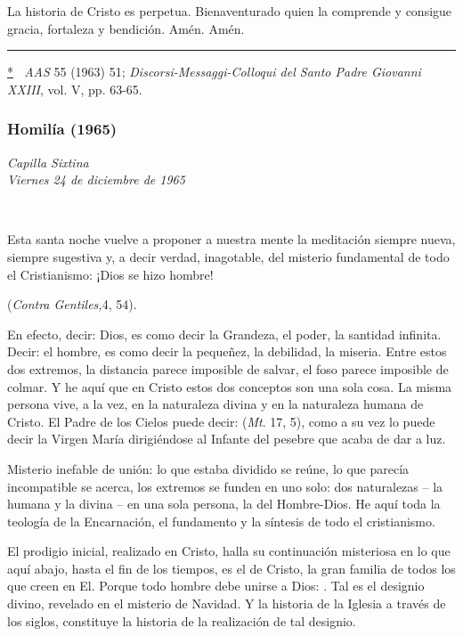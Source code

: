 La historia de Cristo es perpetua. Bienaventurado quien la comprende y consigue gracia, fortaleza y bendición. Amén. Amén.

\begin{center}\rule{0.5\linewidth}{\linethickness}\end{center}

\protect\hyperlink{_ednrefux2a}{*}\emph{~ AAS} 55 (1963) 51; \emph{Discorsi-Messaggi-Colloqui del Santo Padre Giovanni XXIII}, vol. V, pp. 63-65.

\subsubsection{Homilía (1965)} \emph{Capilla Sixtina\\ Viernes 24 de diciembre de 1965}

~

Esta santa noche vuelve a proponer a nuestra mente la meditación siempre nueva, siempre sugestiva y, a decir verdad, inagotable, del misterio fundamental de todo el Cristianismo: ¡Dios se hizo hombre!

 (\emph{Contra Gentiles,}4, 54).

En efecto, decir: Dios, es como decir la Grandeza, el poder, la santidad infinita. Decir: el hombre, es como decir la pequeñez, la debilidad, la miseria. Entre estos dos extremos, la distancia parece imposible de salvar, el foso parece imposible de colmar. Y he aquí que en Cristo estos dos conceptos son una sola cosa. La misma persona vive, a la vez, en la naturaleza divina y en la naturaleza humana de Cristo. El Padre de los Cielos puede decir:  (\emph{Mt}. 17, 5), como a su vez lo puede decir la Virgen María dirigiéndose al Infante del pesebre que acaba de dar a luz.

Misterio inefable de unión: lo que estaba dividido se reúne, lo que parecía incompatible se acerca, los extremos se funden en uno solo: dos naturalezas -- la humana y la divina -- en una sola persona, la del Hombre-Dios. He aquí toda la teología de la Encarnación, el fundamento y la síntesis de todo el cristianismo.

El prodigio inicial, realizado en Cristo, halla su continuación misteriosa en lo que aquí abajo, hasta el fin de los tiempos, es el  de Cristo, la gran familia de todos los que creen en El. Porque todo hombre debe unirse a Dios: . Tal es el designio divino, revelado en el misterio de Navidad. Y la historia de la Iglesia a través de los siglos, constituye la historia de la realización de tal designio.

